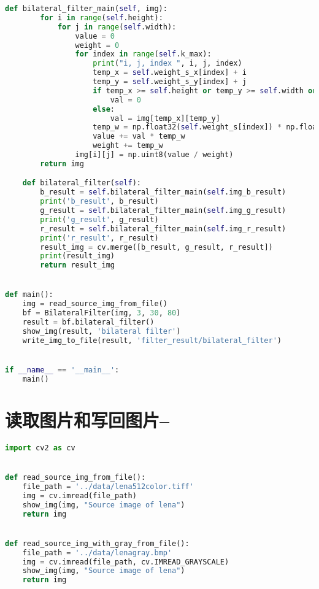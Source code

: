 \documentclass{hitreport}
\begin{document}
\begin{appendices}
\begin{lstlisting}[language=python]
    def bilateral_filter_main(self, img):
        for i in range(self.height):
            for j in range(self.width):
                value = 0
                weight = 0
                for index in range(self.k_max):
                    print("i, j, index ", i, j, index)
                    temp_x = self.weight_s_x[index] + i
                    temp_y = self.weight_s_y[index] + j
                    if temp_x >= self.height or temp_y >= self.width or temp_x < 0 or temp_y < 0:
                        val = 0
                    else:
                        val = img[temp_x][temp_y]
                    temp_w = np.float32(self.weight_s[index]) * np.float32(self.color_weight[np.abs(val - img[i][j])])
                    value += val * temp_w
                    weight += temp_w
                img[i][j] = np.uint8(value / weight)
        return img

    def bilateral_filter(self):
        b_result = self.bilateral_filter_main(self.img_b_result)
        print('b_result', b_result)
        g_result = self.bilateral_filter_main(self.img_g_result)
        print('g_result', g_result)
        r_result = self.bilateral_filter_main(self.img_r_result)
        print('r_result', r_result)
        result_img = cv.merge([b_result, g_result, r_result])
        print(result_img)
        return result_img


def main():
    img = read_source_img_from_file()
    bf = BilateralFilter(img, 3, 30, 80)
    result = bf.bilateral_filter()
    show_img(result, 'bilateral filter')
    write_img_to_file(result, 'filter_result/bilateral_filter')


if __name__ == '__main__':
    main()

\end{lstlisting}



\section{读取图片和写回图片--}
\begin{lstlisting}[language=python]
import cv2 as cv


def read_source_img_from_file():
    file_path = '../data/lena512color.tiff'
    img = cv.imread(file_path)
    show_img(img, "Source image of lena")
    return img


def read_source_img_with_gray_from_file():
    file_path = '../data/lenagray.bmp'
    img = cv.imread(file_path, cv.IMREAD_GRAYSCALE)
    show_img(img, "Source image of lena")
    return img



\end{lstlisting}
\end{appendices}
\end{document}
